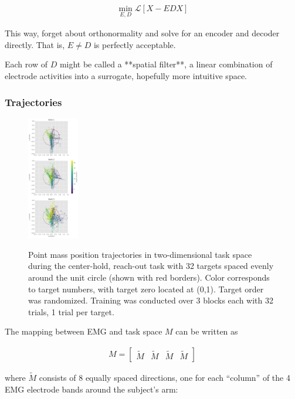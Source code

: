 \documentclass[../main.tex]{subfiles}
\begin{document}
\begin{align}
  \min_{E,D}{\mathcal{L}\left[X - EDX\right]}
\end{align}

This way, forget about orthonormality and solve for an encoder and decoder directly. That is, $E\neq{D}$ is perfectly acceptable.

Each row of $D$ might be called a **spatial filter**, a linear combination of electrode activities into a surrogate, hopefully more intuitive space.

\subsubsection{Trajectories}

\begin{figure}
  \label{fig:trajectories}
  \centering
  \includegraphics[width=0.2\textwidth]{images/data_analysis/center_hold/trajectories.pdf}
  \caption{Point mass position trajectories in two-dimensional task space during the center-hold, reach-out task with 32 targets spaced evenly around the unit circle (shown with red borders). Color corresponds to target numbers, with target zero located at (0,1). Target order was randomized. Training was conducted over 3 blocks each with 32 trials, 1 trial per target.}\label{fig:trajectories}
\end{figure}


The mapping between EMG and task space $M$ can be written as

\begin{align}
M = \begin{bmatrix}\tilde{M} & \tilde{M} & \tilde{M} & \tilde{M}\end{bmatrix}
\end{align}

where $\tilde{M}$ consists of 8 equally spaced directions, one for
each ``column'' of the 4 EMG electrode bands around the subject's arm:
\end{document}
